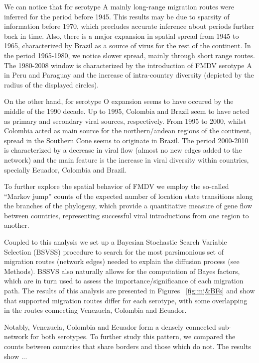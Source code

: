 \documentclass[10pt]{article}
\begin{document}
We can notice that for serotype A mainly long-range migration routes were inferred for the period before 1945.
This results may be due to sparsity of information before 1970, which precludes accurate inference about periods further back in time. 
Also, there is a major expansion in spatial spread from 1945 to 1965, characterized by Brazil as a source of virus for the rest of the continent.
In the period 1965-1980, we notice slower spread, mainly through short range routes.
The 1980-2008 window is characterized by the introduction of FMDV serotype A in Peru and Paraguay and the increase of intra-country diversity (depicted by the radius of the displayed circles).   

On the other hand, for serotype O expansion seems to have occured by the middle of the 1990 decade.
Up to 1995, Colombia and Brazil seem to have acted as primary and secondary viral sources, respectively.
From 1995 to 2000, whilst Colombia acted as main source for the northern/andean regions of the continent, spread in the Southern Cone seems to originate in Brazil.
The period 2000-2010 is characterized by a decrease in viral flow (almost no new edges added to the network) and the main feature is the increase in viral diversity within countries, specially Ecuador, Colombia and Brazil.
	
To further explore the spatial behavior of FMDV we employ the so-called ``Markov jump'' counts \cite{Minin2008} of the expected number of location state transitions along the  branches of the phylogeny, which  provide a quantitative measure of gene flow between countries, representing successful viral introductions from one region to another.

Coupled to this analysis we set up a Bayesian Stochastic Search Variable Selection (BSVSS) procedure to search for the most parsimonious set of migration routes (network edges) needed to explain the diffusion process (see Methods).
BSSVS also naturally allows for the computation of Bayes factors, which are in turn used to assess the importance/significance of each migration path.
The results of this analysis are presented in Figures ~\ref{fig:mj&BFs} and show that supported migration routes differ for each serotype, with some overlapping in the routes connecting Venezuela, Colombia and Ecuador.

Notably, Venezuela, Colombia and Ecuador form a densely connected sub-network for both serotypes.
To further study this pattern, we compared the counts between countries that share borders and those which do not. The results show ... %
\end{document}
